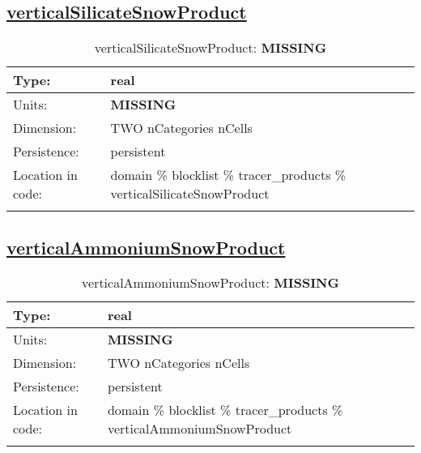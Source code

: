 \subsection[verticalSilicateSnowProduct]{\hyperref[sec:var_tab_tracer_products]{verticalSilicateSnowProduct}}
\label{subsec:var_sec_tracer_products_verticalSilicateSnowProduct}
\begin{center}
\begin{longtable}{| p{2.0in} | p{4.0in} |}
        \hline 
        Type: & real \\
        \hline 
        Units: & {\bf \color{red} MISSING} \\
        \hline 
        Dimension: & TWO nCategories nCells \\
        \hline 
        Persistence: & persistent \\
        \hline 
         Location in code: & domain \% blocklist \% tracer\_products \% verticalSilicateSnowProduct \\
         \hline 
    \caption{verticalSilicateSnowProduct: {\bf \color{red} MISSING}}
\end{longtable}
\end{center}
\subsection[verticalAmmoniumSnowProduct]{\hyperref[sec:var_tab_tracer_products]{verticalAmmoniumSnowProduct}}
\label{subsec:var_sec_tracer_products_verticalAmmoniumSnowProduct}
\begin{center}
\begin{longtable}{| p{2.0in} | p{4.0in} |}
        \hline 
        Type: & real \\
        \hline 
        Units: & {\bf \color{red} MISSING} \\
        \hline 
        Dimension: & TWO nCategories nCells \\
        \hline 
        Persistence: & persistent \\
        \hline 
         Location in code: & domain \% blocklist \% tracer\_products \% verticalAmmoniumSnowProduct \\
         \hline 
    \caption{verticalAmmoniumSnowProduct: {\bf \color{red} MISSING}}
\end{longtable}
\end{center}
